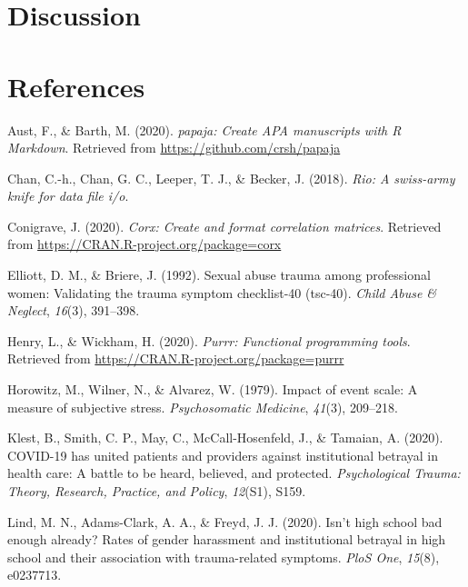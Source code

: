\documentclass[
  english,
  man, noextraspace]{apa6}
\begin{document}
\hypertarget{discussion}{%
\section{Discussion}\label{discussion}}

\newpage

\hypertarget{references}{%
\section{References}\label{references}}

\begingroup
\setlength{\parindent}{-0.5in}
\setlength{\leftskip}{0.5in}

\hypertarget{refs}{}
\leavevmode\hypertarget{ref-R-papaja}{}%
Aust, F., \& Barth, M. (2020). \emph{papaja: Create APA manuscripts with R Markdown}. Retrieved from \url{https://github.com/crsh/papaja}

\leavevmode\hypertarget{ref-R-rio}{}%
Chan, C.-h., Chan, G. C., Leeper, T. J., \& Becker, J. (2018). \emph{Rio: A swiss-army knife for data file i/o}.

\leavevmode\hypertarget{ref-R-corx}{}%
Conigrave, J. (2020). \emph{Corx: Create and format correlation matrices}. Retrieved from \url{https://CRAN.R-project.org/package=corx}

\leavevmode\hypertarget{ref-elliott1992}{}%
Elliott, D. M., \& Briere, J. (1992). Sexual abuse trauma among professional women: Validating the trauma symptom checklist-40 (tsc-40). \emph{Child Abuse \& Neglect}, \emph{16}(3), 391--398.

\leavevmode\hypertarget{ref-R-purrr}{}%
Henry, L., \& Wickham, H. (2020). \emph{Purrr: Functional programming tools}. Retrieved from \url{https://CRAN.R-project.org/package=purrr}

\leavevmode\hypertarget{ref-horowitz1979}{}%
Horowitz, M., Wilner, N., \& Alvarez, W. (1979). Impact of event scale: A measure of subjective stress. \emph{Psychosomatic Medicine}, \emph{41}(3), 209--218.

\leavevmode\hypertarget{ref-klest2020}{}%
Klest, B., Smith, C. P., May, C., McCall-Hosenfeld, J., \& Tamaian, A. (2020). COVID-19 has united patients and providers against institutional betrayal in health care: A battle to be heard, believed, and protected. \emph{Psychological Trauma: Theory, Research, Practice, and Policy}, \emph{12}(S1), S159.

\leavevmode\hypertarget{ref-lind2020}{}%
Lind, M. N., Adams-Clark, A. A., \& Freyd, J. J. (2020). Isn't high school bad enough already? Rates of gender harassment and institutional betrayal in high school and their association with trauma-related symptoms. \emph{PloS One}, \emph{15}(8), e0237713.
\end{document}
